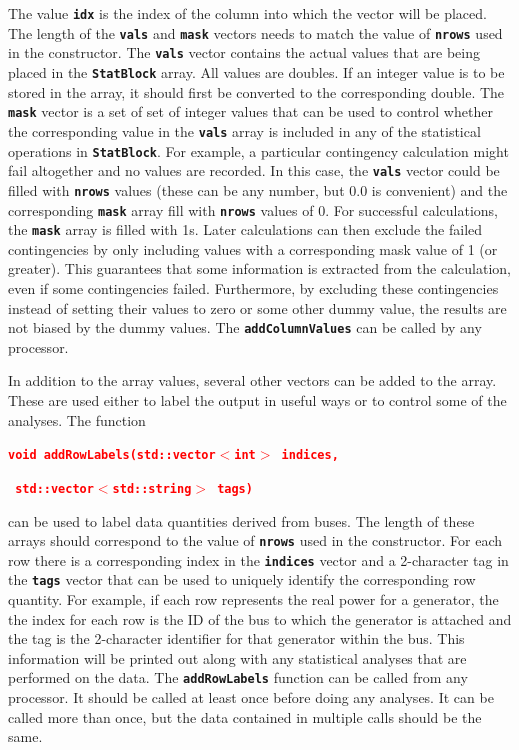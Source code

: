 \documentclass[12pt]{report} %
\begin{document}
The value \texttt{\textbf{idx}} is the index of the column into which the vector will be placed. The length of the \texttt{\textbf{vals}} and \texttt{\textbf{mask}} vectors needs to match the value of \texttt{\textbf{nrows}} used in the constructor. The \texttt{\textbf{vals}} vector contains the actual values that are being placed in the \texttt{\textbf{StatBlock}} array. All values are doubles. If an integer value is to be stored in the array, it should first be converted to the corresponding double. The \texttt{\textbf{mask}} vector is a set of set of integer values that can be used to control whether the corresponding value in the \texttt{\textbf{vals}} array is included in any of the statistical operations in \texttt{\textbf{StatBlock}}. For example, a particular contingency calculation might fail altogether and no values are recorded. In this case, the \texttt{\textbf{vals}} vector could be filled with \texttt{\textbf{nrows}} values (these can be any number, but 0.0 is convenient) and the corresponding \texttt{\textbf{mask}} array fill with \texttt{\textbf{nrows}} values of 0. For successful calculations, the \texttt{\textbf{mask}} array is filled with 1s. Later calculations can then exclude the failed contingencies by only including values with a corresponding mask value of 1 (or greater). This guarantees that some information is extracted from the calculation, even if some contingencies failed. Furthermore, by excluding these contingencies instead of setting their values to zero or some other dummy value, the results are not biased by the dummy values. The \texttt{\textbf{addColumnValues}} can be called by any processor.

In addition to the array values, several other vectors can be added to the array. These are used either to label the output in useful ways or to control some of the analyses. The function

\textcolor{red}{\texttt{\textbf{void addRowLabels(std::vector$\boldsymbol{\mathrm{<}}$int$\boldsymbol{\mathrm{>}}$ indices,}}}

\textcolor{red}{\texttt{\textbf{                  std::vector$\boldsymbol{\mathrm{<}}$std::string$\boldsymbol{\mathrm{>}}$ tags)}}}

can be used to label data quantities derived from buses. The length of these arrays should correspond to the value of \texttt{\textbf{nrows}} used in the constructor. For each row there is a corresponding index in the \texttt{\textbf{indices}} vector and a 2-character tag in the \texttt{\textbf{tags}} vector that can be used to uniquely identify the corresponding row quantity. For example, if each row represents the real power for a generator, the the index for each row is the ID of the bus to which the generator is attached and the tag is the 2-character identifier for that generator within the bus. This information will be printed out along with any statistical analyses that are performed on the data. The \texttt{\textbf{addRowLabels}} function can be called from any processor. It should be called at least once before doing any analyses. It can be called more than once, but the data contained in multiple calls should be the same.
\end{document}
